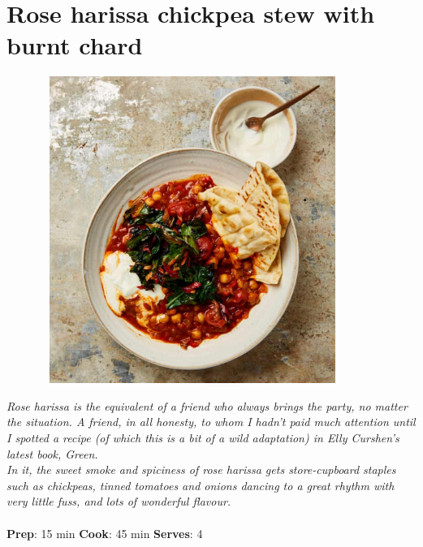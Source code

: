 \documentclass{book}
\begin{document}
\section{Rose harissa chickpea stew with burnt chard}
\begin{figure}
\centering\includegraphics[width=10cm,height=10cm,keepaspectratio]{Recipe_Pictures/Rose_harissa_chickpea_stew_with_burnt_chard.png}
\end{figure}
\emph{Rose harissa is the equivalent of a friend who always brings the party, no matter the situation. A friend, in all honesty, to whom I hadn’t paid much attention until I spotted a recipe (of which this is a bit of a wild adaptation) in Elly Curshen’s latest book, Green.\\ 
In it, the sweet smoke and spiciness of rose harissa gets store-cupboard staples such as chickpeas, tinned tomatoes and onions dancing to a great rhythm with very little fuss, and lots of wonderful flavour.}\\\\ 
\textbf{Prep}: 15 min
\textbf{Cook}: 45 min
\textbf{Serves}: 4
\end{document}
